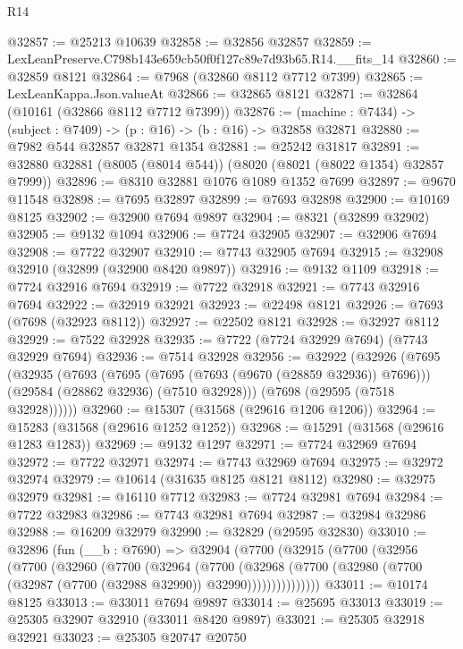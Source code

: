 \begin{lexlean}{R14}
\begin{coremodule}
@32857 := @25213 @10639
@32858 := @32856 @32857
@32859 := LexLeanPreserve.C798b143e659cb50f0f127c89e7d93b65.R14.__fits_14
@32860 := @32859 @8121
@32864 := @7968 (@32860 @8112 @7712 @7399)
@32865 := LexLeanKappa.Json.valueAt
@32866 := @32865 @8121
@32871 := @32864 (@10161 (@32866 @8112 @7712 @7399))
@32876 := (machine : @7434) -> (subject : @7409) -> (p : @16) -> (b : @16) -> @32858 @32871
@32880 := @7982 @544 @32857 @32871 @1354
@32881 := @25242 @31817
@32891 := @32880 @32881 (@8005 (@8014 @544)) (@8020 (@8021 (@8022 @1354) @32857 @7999))
@32896 := @8310 @32881 @1076 @1089 @1352 @7699
@32897 := @9670 @11548
@32898 := @7695 @32897
@32899 := @7693 @32898
@32900 := @10169 @8125
@32902 := @32900 @7694 @9897
@32904 := @8321 (@32899 @32902)
@32905 := @9132 @1094
@32906 := @7724 @32905
@32907 := @32906 @7694
@32908 := @7722 @32907
@32910 := @7743 @32905 @7694
@32915 := @32908 @32910 (@32899 (@32900 @8420 @9897))
@32916 := @9132 @1109
@32918 := @7724 @32916 @7694
@32919 := @7722 @32918
@32921 := @7743 @32916 @7694
@32922 := @32919 @32921
@32923 := @22498 @8121
@32926 := @7693 (@7698 (@32923 @8112))
@32927 := @22502 @8121
@32928 := @32927 @8112
@32929 := @7522 @32928
@32935 := @7722 (@7724 @32929 @7694) (@7743 @32929 @7694)
@32936 := @7514 @32928
@32956 := @32922
    (@32926
      (@7695
        (@32935
          (@7693
            (@7695 (@7695 (@7693 (@9670 (@28859 @32936)) @7696)))
            (@29584 (@28862 @32936) (@7510 @32928)))
          (@7698 (@29595 (@7518 @32928))))))
@32960 := @15307 (@31568 (@29616 @1206 @1206))
@32964 := @15283 (@31568 (@29616 @1252 @1252))
@32968 := @15291 (@31568 (@29616 @1283 @1283))
@32969 := @9132 @1297
@32971 := @7724 @32969 @7694
@32972 := @7722 @32971
@32974 := @7743 @32969 @7694
@32975 := @32972 @32974
@32979 := @10614 (@31635 @8125 @8121 @8112)
@32980 := @32975 @32979
@32981 := @16110 @7712
@32983 := @7724 @32981 @7694
@32984 := @7722 @32983
@32986 := @7743 @32981 @7694
@32987 := @32984 @32986
@32988 := @16209 @32979
@32990 := @32829 (@29595 @32830)
@33010 := @32896
    (fun (__b : @7690) =>
    @32904
      (@7700
        (@32915
          (@7700
            (@32956
              (@7700
                (@32960
                  (@7700
                    (@32964
                      (@7700
                        (@32968
                          (@7700
                            (@32980 (@7700 (@32987 (@7700 (@32988 @32990)) @32990)))))))))))))))
@33011 := @10174 @8125
@33013 := @33011 @7694 @9897
@33014 := @25695 @33013
@33019 := @25305 @32907 @32910 (@33011 @8420 @9897)
@33021 := @25305 @32918 @32921
@33023 := @25305 @20747 @20750

\end{coremodule}
\end{lexlean}
